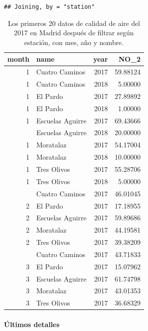 \documentclass[]{book}
\let\oldparagraph\paragraph
\renewcommand{\paragraph}[1]{\oldparagraph{#1}\mbox{}}
\begin{document}
\begin{verbatim}
## Joining, by = "station"
\end{verbatim}

\begin{table}

\caption{\label{tab:Madrid2017d}Los primeros 20 datos de calidad de aire del 2017 en Madrid después de filtrar según estación, con mes, año y nombre.}
\centering
\begin{tabular}[t]{rlrr}
\toprule
month & name & year & NO\_2\\
\midrule
1 & Cuatro Caminos & 2017 & 59.88124\\
1 & Cuatro Caminos & 2018 & 5.00000\\
1 & El Pardo & 2017 & 27.89892\\
1 & El Pardo & 2018 & 1.00000\\
1 & Escuelas Aguirre & 2017 & 69.43666\\
\addlinespace
1 & Escuelas Aguirre & 2018 & 20.00000\\
1 & Moratalaz & 2017 & 54.17004\\
1 & Moratalaz & 2018 & 10.00000\\
1 & Tres Olivos & 2017 & 55.28706\\
1 & Tres Olivos & 2018 & 5.00000\\
\addlinespace
2 & Cuatro Caminos & 2017 & 46.01045\\
2 & El Pardo & 2017 & 17.18955\\
2 & Escuelas Aguirre & 2017 & 59.89686\\
2 & Moratalaz & 2017 & 44.19581\\
2 & Tres Olivos & 2017 & 39.38209\\
\addlinespace
3 & Cuatro Caminos & 2017 & 43.71833\\
3 & El Pardo & 2017 & 15.07962\\
3 & Escuelas Aguirre & 2017 & 61.74798\\
3 & Moratalaz & 2017 & 43.01353\\
3 & Tres Olivos & 2017 & 36.68329\\
\bottomrule
\end{tabular}
\end{table}

\hypertarget{ultimos-detalles}{%
\paragraph{Últimos detalles}\label{ultimos-detalles}}
\end{document}
